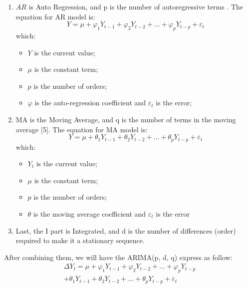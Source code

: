 \documentclass{ieeeojies}
\begin{document}
\begin{enumerate}
    \item$AR$ is Auto Regression, and p is the number of autoregressive terms \cite{b8}. The equation for AR model is:
          \begin{equation}
              Y = \mu + \varphi_1Y_{t-1} + \varphi_2Y_{t-2} + ... + \varphi_pY_{t-p} + \varepsilon_t
          \end{equation}
          which:
          \begin{itemize}
              \item $Y$ is the current value;
              \item $\mu$ is the constant term;
              \item $p$ is the number of orders;
              \item $\varphi$ is the auto-regression coefficient and $\varepsilon_t$ is the error;
          \end{itemize}
    \item MA is the Moving Average, and q is the number of terms in the moving average [5]. The equation for MA model is:
          \begin{equation}
              Y = \mu + \theta_1Y_{t-1} + \theta_2Y_{t-2} + ... + \theta_pY_{t-p} + \varepsilon_t
          \end{equation}
          which:
          \begin{itemize}
            \item $Y_t$ is the current value;
            \item $\mu$ is the constant term;
            \item $p$ is the number of orders;
            \item $\theta$ is the moving average coefficient and $\varepsilon_t$ is the error
          \end{itemize}
    \item Last, the I part is Integrated, and d is the number of differences (order) required to make it a stationary sequence.
\end{enumerate}

After combining them, we will have the ARIMA(p, d, q) express as follow:
\begin{equation}
    \begin{aligned}
        \Delta Y_t = \mu + \varphi_1Y_{t-1} + \varphi_2Y_{t-2} + ... +\varphi_pY_{t-p} \\
        + \theta_1Y_{t-1} + \theta_2Y_{t-2} + ... + \theta_pY_{t-p} + \varepsilon_t
    \end{aligned}
\end{equation}
\end{document}
